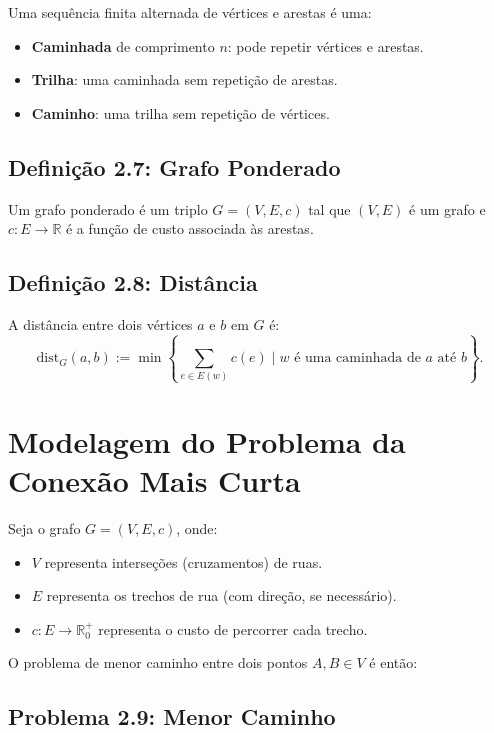 \documentclass[a4paper,12pt]{article}
\begin{document}
Uma sequência finita alternada de vértices e arestas é uma:

\begin{itemize}[noitemsep]
  \item \textbf{Caminhada} de comprimento \( n \): pode repetir vértices e arestas.
  \item \textbf{Trilha}: uma caminhada sem repetição de arestas.
  \item \textbf{Caminho}: uma trilha sem repetição de vértices.
\end{itemize}

\subsection*{Definição 2.7: Grafo Ponderado}

Um grafo ponderado é um triplo \( G = (V, E, c) \) tal que \( (V, E) \) é um grafo e \( c : E \rightarrow \mathbb{R} \) é a função de custo associada às arestas.

\subsection*{Definição 2.8: Distância}

A distância entre dois vértices \( a \) e \( b \) em \( G \) é:
\[
\mathrm{dist}_G(a, b) := \min \left\{ \sum_{e \in E(w)} c(e) \mid w \text{ é uma caminhada de } a \text{ até } b \right\}.
\]

\section{Modelagem do Problema da Conexão Mais Curta}

Seja o grafo \( G = (V, E, c) \), onde:

\begin{itemize}[noitemsep]
  \item \( V \) representa interseções (cruzamentos) de ruas.
  \item \( E \) representa os trechos de rua (com direção, se necessário).
  \item \( c : E \rightarrow \mathbb{R}_0^+ \) representa o custo de percorrer cada trecho.
\end{itemize}

O problema de menor caminho entre dois pontos \( A, B \in V \) é então:

\subsection*{Problema 2.9: Menor Caminho}
\end{document}
